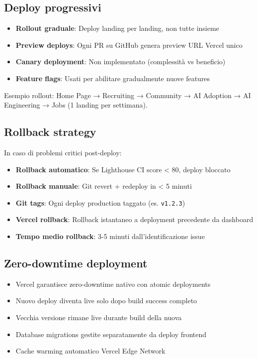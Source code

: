 \subsection{Deploy progressivi}
\begin{itemize}
  \item \textbf{Rollout graduale}: Deploy landing per landing, non tutte 
        insieme
  \item \textbf{Preview deploys}: Ogni PR su GitHub genera preview URL 
        Vercel unico
  \item \textbf{Canary deployment}: Non implementato (complessità vs 
        beneficio)
  \item \textbf{Feature flags}: Usati per abilitare gradualmente nuove 
        features
\end{itemize}

Esempio rollout: Home Page → Recruiting → Community → AI Adoption → 
AI Engineering → Jobs (1 landing per settimana).

\subsection{Rollback strategy}
In caso di problemi critici post-deploy:

\begin{itemize}
  \item \textbf{Rollback automatico}: Se Lighthouse CI score < 80, 
        deploy bloccato
  \item \textbf{Rollback manuale}: Git revert + redeploy in < 5 minuti
  \item \textbf{Git tags}: Ogni deploy production taggato 
        (es. \texttt{v1.2.3})
  \item \textbf{Vercel rollback}: Rollback istantaneo a deployment 
        precedente da dashboard
  \item \textbf{Tempo medio rollback}: 3-5 minuti dall'identificazione 
        issue
\end{itemize}

\subsection{Zero-downtime deployment}
\begin{itemize}
  \item Vercel garantisce zero-downtime nativo con atomic deployments
  \item Nuovo deploy diventa live solo dopo build success completo
  \item Vecchia versione rimane live durante build della nuova
  \item Database migrations gestite separatamente da deploy frontend
  \item Cache warming automatico Vercel Edge Network
\end{itemize}

